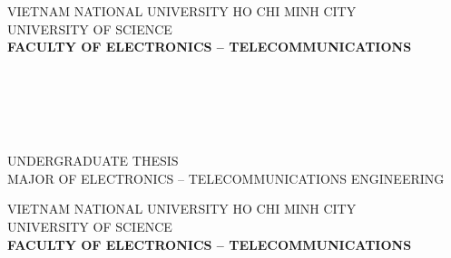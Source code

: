 \hypersetup{pageanchor=false}
\begin{titlepage}

\begin{center}
VIETNAM NATIONAL UNIVERSITY HO CHI MINH CITY\\
UNIVERSITY OF SCIENCE\\
\textbf{FACULTY OF ELECTRONICS -- TELECOMMUNICATIONS}\\[2cm]


{ \Large \bfseries {} \\[2cm] } 

{ \Large \bfseries \textbf{\tenKL} \\[3cm]} 


\large \text{} \\ 
\large \text{} \\
\large UNDERGRADUATE THESIS\\
\large MAJOR OF ELECTRONICS -- TELECOMMUNICATIONS ENGINEERING\\


\vfill
{}

\end{center}

\pagebreak


\begin{center}
VIETNAM NATIONAL UNIVERSITY HO CHI MINH CITY\\
UNIVERSITY OF SCIENCE\\
\textbf{FACULTY OF ELECTRONICS -- TELECOMMUNICATIONS}\\[2cm]



\end{center}
\end{titlepage}
